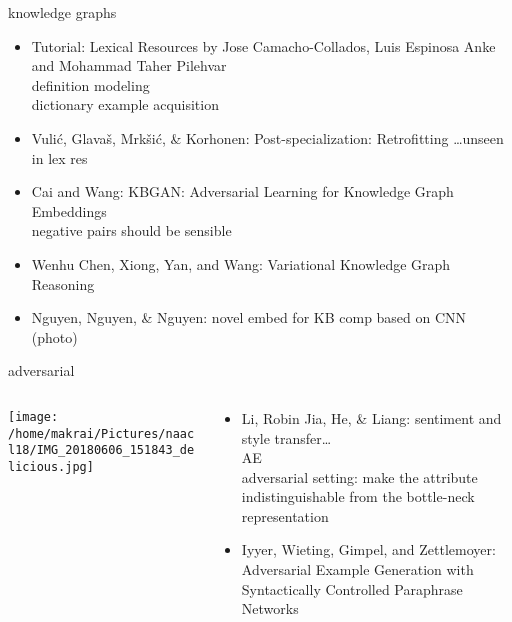 \documentclass{beamer}
\begin{document}
\begin{frame}{knowledge graphs}
  \begin{itemize}
    \item Tutorial: Lexical Resources 
      by Jose Camacho-Collados, Luis Espinosa Anke and Mohammad Taher Pilehvar 
                \\ definition modeling
                \\ dictionary example acquisition
    \item Vulić, Glavaš, Mrkšić, \& Korhonen: 
      Post-specialization: Retrofitting \dots  unseen in lex res
    \item Cai and Wang: KBGAN: Adversarial Learning for Knowledge Graph Embeddings
      \\ negative pairs should be sensible
    \item Wenhu Chen, Xiong, Yan, and Wang: Variational Knowledge Graph Reasoning
    \item Nguyen, Nguyen, \& Nguyen: novel embed for KB comp based on CNN (photo)
  \end{itemize}
\end{frame}

\begin{frame}{adversarial}
\begin{columns}\begin{column}{.35\textwidth}\centering \texttt{[image: /home/makrai/Pictures/naacl18/IMG\_20180606\_151843\_delicious.jpg]}\end{column}\begin{column}{.65\textwidth}
  \begin{itemize}
    \item Li, Robin Jia, He, \& Liang: sentiment and style transfer\dots 
      \\ AE
      \\ adversarial setting: make the attribute indistinguishable from the
      bottle-neck representation
    \item Iyyer, Wieting, Gimpel, and Zettlemoyer:  
      Adversarial Example Generation 
      with Syntactically Controlled Paraphrase Networks
  \end{itemize}
\end{column}\end{columns}
\end{frame}

\end{document}
